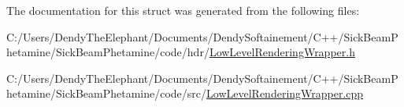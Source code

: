 The documentation for this struct was generated from the following files\+:\begin{DoxyCompactItemize}
\item 
C\+:/\+Users/\+Dendy\+The\+Elephant/\+Documents/\+Dendy\+Softainement/\+C++/\+Sick\+Beam\+Phetamine/\+Sick\+Beam\+Phetamine/code/hdr/\hyperlink{_low_level_rendering_wrapper_8h}{Low\+Level\+Rendering\+Wrapper.\+h}\item 
C\+:/\+Users/\+Dendy\+The\+Elephant/\+Documents/\+Dendy\+Softainement/\+C++/\+Sick\+Beam\+Phetamine/\+Sick\+Beam\+Phetamine/code/src/\hyperlink{_low_level_rendering_wrapper_8cpp}{Low\+Level\+Rendering\+Wrapper.\+cpp}\end{DoxyCompactItemize}
